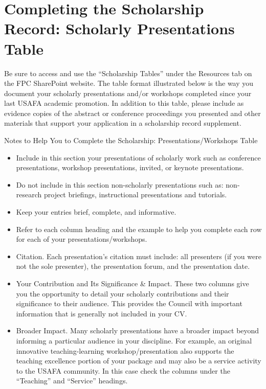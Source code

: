 \documentclass[11pt,titlepage]{article}
\begin{document}
\section{Completing the Scholarship Record: Scholarly Presentations Table}  %
Be sure to access and use the ``Scholarship Tables'' under the Resources tab on the \gls{FPC} SharePoint website.
The table format illustrated below is the way you document your scholarly presentations and/or workshops completed since your last USAFA academic promotion.
In addition to this table, please include as evidence copies of the abstract or conference proceedings you presented and other materials that support your application in a scholarship record supplement.

Notes to Help You to Complete the Scholarship: Presentations/Workshops Table
\begin{itemize}
  \item
  Include in this section your presentations of scholarly work such as conference presentations, workshop presentations, invited, or keynote presentations.

  \item
  Do not include in this section non-scholarly presentations such as: non-research project briefings, instructional presentations and tutorials.

  \item
  Keep your entries brief, complete, and informative.

  \item
  Refer to each column heading and the example to help you complete each row for each of
your presentations/workshops.

  \item
  Citation.
  Each presentation's citation must include: all presenters (if you were not the sole presenter), the presentation forum, and the presentation date.

  \item
  Your Contribution and Its Significance \& Impact.
  These two columns give you the opportunity to detail your scholarly contributions and their significance to their audience.
  This provides the Council with important information that is generally not included in your \gls{CV}.

  \item
  Broader Impact.
  Many scholarly presentations have a broader impact beyond informing a particular audience in your discipline.
  For example, an original innovative teaching-learning workshop/presentation also supports the teaching excellence portion of your package and may also be a service activity to the USAFA community.
  In this case check the columns under the ``Teaching'' and ``Service'' headings.
\end{itemize}
\end{document}
